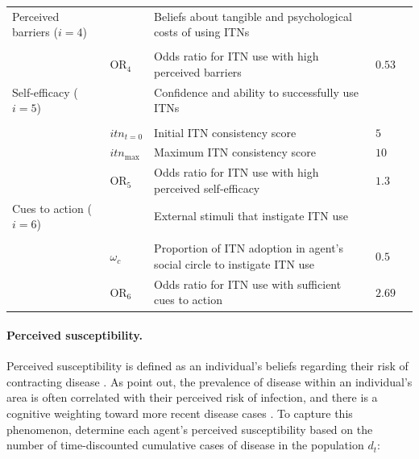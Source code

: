 \begin{table}[htp!]
\begin{adjustbox}{center}
\begin{tabular}{m{3cm} >{\centering\arraybackslash}m{2cm} m{6cm} >{\centering\arraybackslash}m{2cm} m{3cm}}
        Perceived barriers ($i=4$) 
        &  & Beliefs about tangible and psychological costs of using ITNs &  & \citet{champion_health_2015} \\
        & & & & \\
        & \centering $\text{OR}_4$ & Odds ratio for ITN use with high perceived barriers & \centering $0.53$ & \citet{yirsaw_insecticide-treated_2021} \\ \midrule
        
        Self-efficacy ($i=5$) 
        &  & Confidence and ability to successfully use ITNs &  & \citet{champion_health_2015} \\
        & & & & \\
        & \centering $itn_{t=0}$ & Initial ITN consistency score & \centering $5$ &  \\
        & \centering $itn_{\max}$ & Maximum ITN consistency score & \centering $10$ &  \\
        & \centering $\text{OR}_5$ & Odds ratio for ITN use with high perceived self-efficacy & \centering $1.3$ & \citet{storey_associations_2018, babalola_factors_2018} \\ \midrule
        
        Cues to action ($i=6$) 
        &  & External stimuli that instigate ITN use &  & \citet{champion_health_2015} \\
        & & & & \\
        & \centering $\omega_c$ & Proportion of ITN adoption in agent's social circle to instigate ITN use & \centering $0.5$ &  \\
        & \centering $\text{OR}_6$ & Odds ratio for ITN use with sufficient cues to action & \centering $2.69$ & \citet{phok_behavioural_2022} \\ \bottomrule
    \end{tabular}
    \end{adjustbox}
    \label{tab:hbm-params}
\end{table}

\paragraph{Perceived susceptibility.}Perceived susceptibility is defined as an individual's beliefs regarding their risk of contracting disease \cite{champion_health_2015}. As \citet{durham_incorporating_2012} point out, the prevalence of disease within an individual's area is often correlated with their perceived risk of infection, and there is a cognitive weighting toward more recent disease cases \cite{funk_modelling_2010}. To capture this phenomenon, \citet{durham_incorporating_2012} determine each agent's perceived susceptibility based on the number of time-discounted cumulative cases of disease in the population $d_t$:


